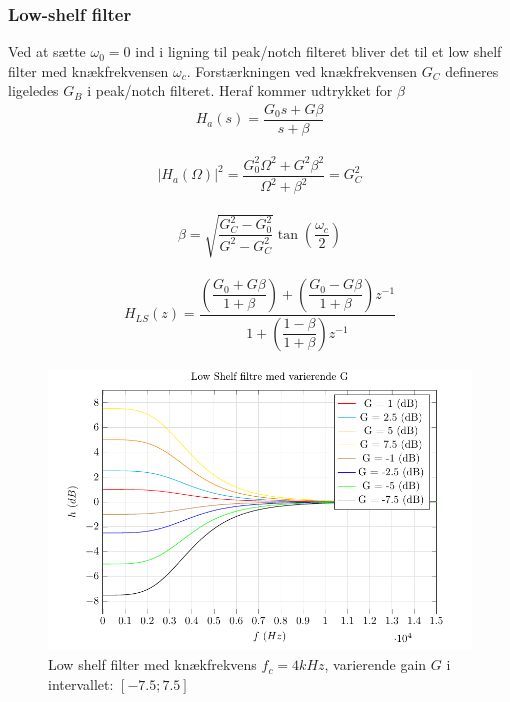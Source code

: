     \subsubsection{Low-shelf filter}


    Ved at sætte $\omega_0 = 0$ ind i ligning til peak/notch 
    filteret bliver det til et low shelf filter med knækfrekvensen $\omega_c$. 
    Forstærkningen ved knækfrekvensen $G_C$ defineres ligeledes $G_B$ i peak/notch filteret.
    Heraf kommer udtrykket for $\beta$ 
    \begin{align}
        H_a (s) = \dfrac{G_0 s + G \beta}{s + \beta}
    \end{align}

    \begin{align}
        |H_a (\Omega)|^2 = \dfrac{G_0^2 \Omega^2 + G^2 \beta^2}{\Omega^2 + \beta^2} = G_C^2
    \end{align}

    \begin{align}
        \beta = \sqrt{\dfrac{G_C^2 - G_0^2}{G^2 - G_C^2}} \tan \left( \dfrac{\omega_c}{2} \right)
    \end{align}

  
     \begin{align}
      H_{LS}(z) =   \dfrac{\left(\dfrac{G_0 + G \beta}{1 + \beta} \right)+ \left(\dfrac{ G_0 - G \beta}{1 + \beta }\right) z^{-1}}{1 + \left( \dfrac{1 - \beta}{1 + \beta} \right) z^{-1}}
     \end{align}

    \begin{figure}[h]
    \centering
        \includegraphics{figure/iir_ls.pdf}
        \caption{Low shelf filter med knækfrekvens $f_c = 4kHz$, varierende gain $G$ i intervallet: $[-7.5 ; 7.5]$}
    \end{figure} 
   
